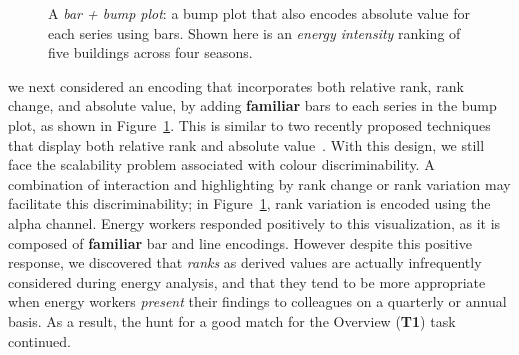 \documentclass[journal]{vgtc}                %
\newcommand{\bstart}[1]{\vspace{1mm} \noindent{\textbf{#1:}}}
\begin{document}
\begin{figure}[ht]
	\centering
	\vspace{-0.3cm}
	\caption{A \textsl{bar + bump plot}: a bump plot that also encodes absolute value for each series using bars. Shown here is an \textsl{energy intensity} ranking of five buildings across four seasons.}
	\label{fig:sandbox-barbump}
	\vspace{-0.6cm}
\end{figure}

\bstart{Bump + bar plots} we next considered an encoding that incorporates both relative rank, rank change, and absolute value, by adding {\bf familiar} bars to each series in the bump plot, as shown in Figure~\ref{fig:sandbox-barbump}. 
This is similar to two recently proposed techniques that display both relative rank and absolute value~\cite{Gratzl2013,Hur2013}. 
With this design, we still face the scalability problem associated with colour discriminability.
A combination of interaction and highlighting by rank change or rank variation may facilitate this discriminability; in Figure~\ref{fig:sandbox-barbump}, rank variation is encoded using the alpha channel.
Energy workers responded positively to this visualization, as it is composed of {\bf familiar} bar and line encodings. 
However despite this positive response, we discovered that {\it ranks} as derived values are actually infrequently considered during energy analysis, and that they tend to be more appropriate when energy workers {\it present} their findings to colleagues on a quarterly or annual basis.
As a result, the hunt for a good match for the Overview ({\bf T1}) task continued.
\end{document}
